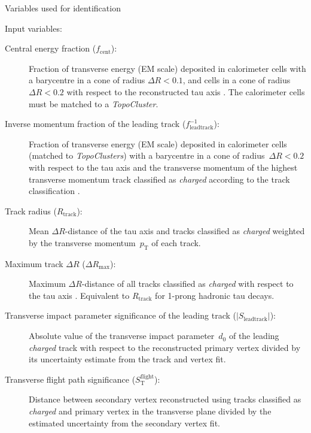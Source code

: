 \begin{table}[ht]
  \centering
  
  \caption{Variables used for identification}
  \label{tab:baseline_variables}
\end{table}


Input variables:
\begin{description}
\item[Central energy fraction ($f_\text{cent}$):] Fraction of transverse energy
  (EM scale) deposited in calorimeter cells with a barycentre in a cone of
  radius $\Delta R < 0.1$, and cells in a cone of radius $\Delta R < 0.2$ with
  respect to the reconstructed tau axis . The
  calorimeter cells must be matched to a \emph{TopoCluster}.

\item[Inverse momentum fraction of the leading track
  ($f_\text{leadtrack}^{-1}$):] Fraction of transverse energy (EM scale)
  deposited in calorimeter cells (matched to \emph{TopoClusters}) with a
  barycentre in a cone of radius~$\Delta R < 0.2$ with respect to the tau axis
   and the transverse momentum of the highest transverse
  momentum track classified as \emph{charged} according to the track
  classification .

\item[Track radius ($R_\text{track}$):] Mean $\Delta R$-distance of the
  tau axis  and tracks classified as \emph{charged}
  weighted by the transverse momentum~$p_\text{T}$ of each track.

\item[Maximum track $\Delta R$ ($\Delta R_\text{max}$):] Maximum
  $\Delta R$-distance of all tracks classified as \emph{charged} with respect to
  the tau axis . Equivalent to $R_\text{track}$
  for 1-prong hadronic tau decays.

\item[Transverse impact parameter significance of the leading track
  ($| S_\text{leadtrack} |$):] Absolute value of the transverse impact
  parameter~$d_0$ of the leading \emph{charged} track with respect to the
  reconstructed primary vertex divided by its uncertainty estimate from the
  track and vertex fit.

\item[Transverse flight path significance ($S_\text{T}^\text{flight}$):]
  Distance between secondary vertex reconstructed using tracks classified as
  \emph{charged} and primary vertex in the transverse plane divided by the
  estimated uncertainty from the secondary vertex fit.


\end{description}
